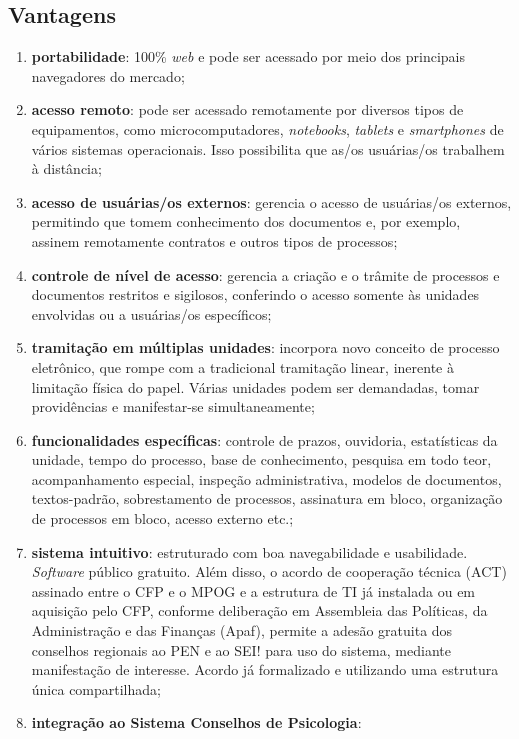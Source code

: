 \documentclass[openright, twoside, a4paper]{memoir}
\begin{document}
\subsection{Vantagens}

\begin{enumerate}

\item
    \textbf{portabilidade}: 100\% \emph{web} e pode ser acessado por meio
    dos principais navegadores do mercado;
\item
    \textbf{acesso remoto}: pode ser acessado remotamente por diversos
    tipos de equipamentos, como microcomputadores, \emph{notebooks},
    \emph{tablets} e \emph{smartphones} de vários sistemas operacionais.
    Isso possibilita que as/os usuárias/os trabalhem à distância;
\item
    \textbf{acesso de usuárias/os externos}: gerencia o acesso de
    usuárias/os externos, permitindo que tomem conhecimento dos documentos
    e, por exemplo, assinem remotamente contratos e outros tipos de
    processos;
\item
    \textbf{controle de nível de acesso}: gerencia a criação e o trâmite
    de processos e documentos restritos e sigilosos, conferindo o acesso
    somente às unidades envolvidas ou a usuárias/os específicos;
\item
    \textbf{tramitação em múltiplas unidades}: incorpora novo conceito de
    processo eletrônico, que rompe com a tradicional tramitação linear,
    inerente à limitação física do papel. Várias unidades podem ser
    demandadas, tomar providências e manifestar-se simultaneamente;
\item
    \textbf{funcionalidades específicas}: controle de prazos, ouvidoria,
    estatísticas da unidade, tempo do processo, base de conhecimento,
    pesquisa em todo teor, acompanhamento especial, inspeção
    administrativa, modelos de documentos, textos-padrão, sobrestamento de
    processos, assinatura em bloco, organização de processos em bloco,
    acesso externo etc.;
\item
    \textbf{sistema intuitivo}: estruturado com boa navegabilidade e
    usabilidade. \emph{Software} público gratuito. Além disso, o acordo de
    cooperação técnica (ACT) assinado entre o CFP e o MPOG e a estrutura
    de TI já instalada ou em aquisição pelo CFP, conforme deliberação em
    Assembleia das Políticas, da Administração e das Finanças (Apaf),
    permite a adesão gratuita dos conselhos regionais ao PEN e ao SEI!
    para uso do sistema, mediante manifestação de interesse. Acordo já
    formalizado e utilizando uma estrutura única compartilhada;
\item
    \textbf{integração ao Sistema Conselhos de Psicologia}:
\end{enumerate}
\end{document}
